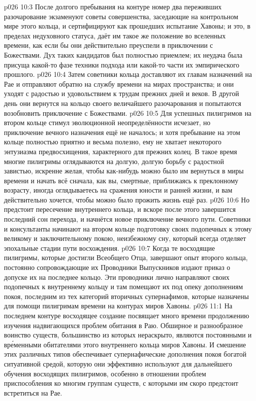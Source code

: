 \vs p026 10:3 После долгого пребывания на контуре номер два переживших разочарование экзаменуют советы совершенства, заседающие на контрольном мире этого кольца, и сертифицируют как прошедших испытание Хавоны; и это, в пределах недуховного статуса, даёт им такое же положение во вселенных времени, как если бы они действительно преуспели в приключении с Божествами. Дух таких кандидатов был полностью приемлем; их неудача была присуща какой\hyp{}то фазе техники подхода или какой\hyp{}то части их эмпирического прошлого.
\vs p026 10:4 Затем советники кольца доставляют их главам назначений на Рае и отправляют обратно на службу времени на мирах пространства; и они уходят с радостью и удовольствием к трудам прежних дней и веков. В другой день они вернутся на кольцо своего величайшего разочарования и попытаются возобновить приключение с Божествами.
\vs p026 10:5 Для успешных пилигримов на втором кольце стимул эволюционной неопределённости исчезает, но приключение вечного назначения ещё не началось; и хотя пребывание на этом кольце полностью приятно и весьма полезно, ему не хватает некоторого энтузиазма предвосхищения, характерного для прежних колец. В такое время многие пилигримы оглядываются на долгую, долгую борьбу с радостной завистью, искренне желая, чтобы как\hyp{}нибудь можно было им вернуться в миры времени и начать всё сначала, как вы, смертные, приближаясь к преклонному возрасту, иногда оглядываетесь на сражения юности и ранней жизни, и вам действительно хочется, чтобы можно было прожить жизнь ещё раз.
\vs p026 10:6 Но предстоит пересечение внутреннего кольца, и вскоре после этого завершится последний сон перехода, и начнётся новое приключение вечного пути. Советники и консультанты начинают на втором кольце подготовку своих подопечных к этому великому и заключительному покою, неизбежному сну, который всегда отделяет эпохальные стадии пути восхождения.
\vs p026 10:7 Когда те восходящие пилигримы, которые достигли Всеобщего Отца, завершают опыт второго кольца, постоянно сопровождающие их Проводники Выпускников издают приказ о допуске их на последнее кольцо. Эти проводники лично направляют своих подопечных к внутреннему кольцу и там помещают их под опеку дополнениям покоя, последним из тех категорий вторичных супернафимов, которые назначены для помощи пилигримам времени на контурах миров Хавоны.
\vs p026 11:1 На последнем контуре восходящее создание посвящает много времени продолжению изучения надвигающихся проблем обитания в Раю. Обширное и разнообразное воинство существ, большинство из которых нераскрыто, являются постоянными и вр\'еменными обитателями этого внутреннего кольца миров Хавоны. И смешение этих различных типов обеспечивает супернафические дополнения покоя богатой ситуативной средой, которую они эффективно используют для дальнейшего обучения восходящих пилигримов, особенно в отношении проблем приспособления ко многим группам существ, с которыми им скоро предстоит встретиться на Рае.

